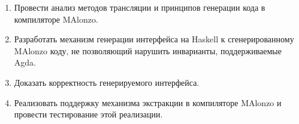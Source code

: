 \begin{enumerate}
\item Провести анализ методов трансляции и принципов генерации кода в компиляторе MAlonzo.
\item Разработать механизм генерации интерфейса на Haskell к сгенерированному
      MAlonzo коду, не позволяющий нарушить инварианты, поддерживаемые Agda.
\item Доказать корректность генерируемого интерфейса.
\item Реализовать поддержку механизма экстракции в компиляторе MAlonzo и провести тестирование этой
      реализации.
\end{enumerate}
